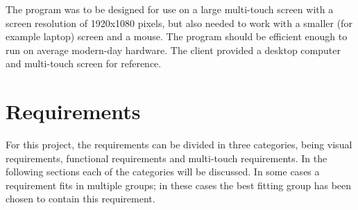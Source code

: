 The program was to be designed for use on a large multi-touch screen with a screen resolution of 1920x1080 pixels, but also needed to work with a smaller (for example laptop) screen and a mouse. The program should be efficient enough to run on average modern-day hardware. The client provided a desktop computer and multi-touch screen for reference.

\section{Requirements}

For this project, the requirements can be divided in three categories, being visual requirements, functional requirements and multi-touch requirements. In the following sections each of the categories will be discussed. In some cases a requirement fits in multiple groups; in these cases the best fitting group has been chosen to contain this requirement.

